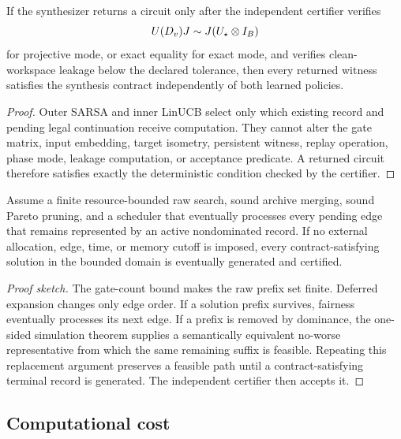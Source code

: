 \begin{theorem}
If the synthesizer returns a circuit only after the independent certifier verifies
\begin{equation}
U(D_v)J\mathrel{\sim} J(U_\star\otimes I_B)
\end{equation}
for projective mode, or exact equality for exact mode, and verifies clean-workspace leakage below the declared tolerance, then every returned witness satisfies the synthesis contract independently of both learned policies.
\end{theorem}
\begin{proof}
Outer SARSA and inner LinUCB select only which existing record and pending legal continuation receive computation. They cannot alter the gate matrix, input embedding, target isometry, persistent witness, replay operation, phase mode, leakage computation, or acceptance predicate. A returned circuit therefore satisfies exactly the deterministic condition checked by the certifier.
\end{proof}

\begin{theorem}
Assume a finite resource-bounded raw search, sound archive merging, sound Pareto pruning, and a scheduler that eventually processes every pending edge that remains represented by an active nondominated record. If no external allocation, edge, time, or memory cutoff is imposed, every contract-satisfying solution in the bounded domain is eventually generated and certified.
\end{theorem}
\begin{proof}[Proof sketch]
The gate-count bound makes the raw prefix set finite. Deferred expansion changes only edge order. If a solution prefix survives, fairness eventually processes its next edge. If a prefix is removed by dominance, the one-sided simulation theorem supplies a semantically equivalent no-worse representative from which the same remaining suffix is feasible. Repeating this replacement argument preserves a feasible path until a contract-satisfying terminal record is generated. The independent certifier then accepts it.
\end{proof}

\subsection{Computational cost}

